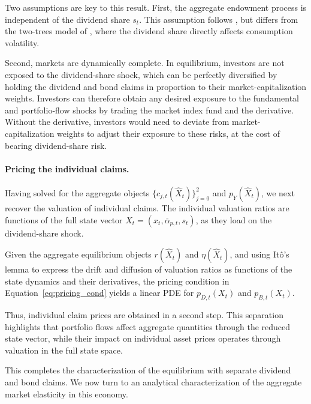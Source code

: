 \documentclass[12pt,english]{article}
\begin{document}
Two assumptions are key to this result.
First, the aggregate endowment process is independent of the dividend share $s_t$.
This assumption follows \citet{MenzlySantosVeronesi2004}, but differs from the two-trees model of \citet{cochraneLongstaffSantaClara2008}, where the dividend share directly affects consumption volatility.

Second, markets are dynamically complete.
In equilibrium, investors are not exposed to the dividend-share shock, which can be perfectly diversified by holding the dividend and bond claims in proportion to their market-capitalization weights.
Investors can therefore obtain any desired exposure to the fundamental and portfolio-flow shocks by trading the market index fund and the derivative.
Without the derivative, investors would need to deviate from market-capitalization weights to adjust their exposure to these risks, at the cost of bearing dividend-share risk.


\paragraph{Pricing the individual claims.}
Having solved for the aggregate objects $\{c_{j,t}(\hat{X}_t)\}_{j=0}^2$ and $p_Y(\hat{X}_t)$, we next recover the valuation of individual claims.
The individual valuation ratios are functions of the full state vector $X_t = (x_{t}, \overline{\alpha}_{p,t}, s_t)$, as they load on the dividend-share shock.

Given the aggregate equilibrium objects $r(\hat{X}_t)$ and $\eta(\hat{X}_t)$, and using It\^{o}'s lemma to express the drift and diffusion of valuation ratios as functions of the state dynamics and their derivatives, the pricing condition in Equation~\eqref{eq:pricing_cond} yields a linear PDE for $p_{D,t}(X_t)$ and $p_{B,t}(X_t)$.

Thus, individual claim prices are obtained in a second step.
This separation highlights that portfolio flows affect aggregate quantities through the reduced state vector, while their impact on individual asset prices operates through valuation in the full state space.

This completes the characterization of the equilibrium with separate dividend and bond claims.
We now turn to an analytical characterization of the aggregate market elasticity in this economy.
\end{document}
